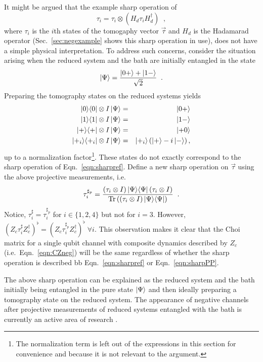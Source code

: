 It might be argued that the example sharp operation of 
\begin{equation}
\label{eqn:sharpref}
\tau_i = \tau_i\otimes \left(H_d\tau_i H_d^\dagger \right)\;\;,
\end{equation}
where $\tau_i$ is the $i$th states of the tomogaphy vector $\vec{\tau}$ and $H_d$ is the Hadamarad operator (Sec.\ \ref{sec:negexample} shows this sharp operation in use), does not have a simple physical interpretation.  To address such concerns, consider the situation arising when the reduced system and the bath are initially entangled in the state
$$
\left|\Psi\right\rangle = \frac{\left|0+\right\rangle+\left|1-\right\rangle}{\sqrt{2}}\;\;.
$$
Preparing the tomography states on the reduced systems yields
\begin{eqnarray*}
|0\rangle\langle0|\otimes I\left|\Psi\right\rangle &=& \left|0+\right\rangle\\
|1\rangle\langle1|\otimes I\left|\Psi\right\rangle &=& \left|1-\right\rangle\\
|+\rangle\langle+|\otimes I\left|\Psi\right\rangle &=& \left|+0\right\rangle\\
|+_i\rangle\langle+_i|\otimes I\left|\Psi\right\rangle &=& \left|+_i\right\rangle\left(\left|+\right\rangle-i\left|-\right\rangle\right),
\end{eqnarray*}
up to a normalization factor\footnote{The normalization term is left out of the expressions in this section for convenience and because it is not relevant to the argument.}.  These states do not exactly correspond to the sharp operation of Eqn.\ \ref{eqn:sharpref}.  Define a new sharp operation on $\vec{\tau}$ using the above projective measurements, i.e.\
\begin{equation}
\label{eqn:sharpPP}
\tau_i^{\sharp_p} = \frac{\left(\tau_i\otimes I\right) |\Psi\rangle\langle\Psi| \left(\tau_i\otimes I\right)}{\operatorname{Tr}{\left(\left(\tau_i\otimes I\right)|\Psi\rangle\langle\Psi|\right)}}\;\;.
\end{equation}
Notice, $\tau_i^\sharp=\tau_i^{\sharp_p}$ for $i\in\{1,2,4\}$ but not for $i=3$.  However, $\left(Z_c\tau_{i}^\sharp Z_c^\dagger\right)^\flat = \left(Z_c\tau_{i}^{\sharp_p} Z_c^\dagger\right)^\flat\;\forall i$.  This observation makes it clear that the Choi matrix for a single qubit channel with composite dynamics described by $Z_c$ (i.e.\ Eqn.\ \ref{eqn:CZneg}) will be the same regardless of whether the sharp operation is described bb Eqn.\ \ref{eqn:sharpref} or Eqn.\ \ref{eqn:sharpPP}.

The above sharp operation can be explained as the reduced system and the bath initially being entangled in the pure state $\left|\Psi\right\rangle$ and then ideally preparing a tomography state on the reduced system.  The appearance of negative channels after projective measurements of reduced systems entangled with the bath is currently an active area of research \cite{Devi2011}.

